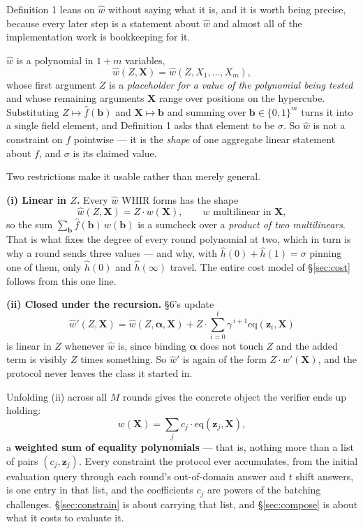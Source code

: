 \documentclass[11pt,a4paper]{article}
\newcommand{\eqp}{\mathrm{eq}}
\begin{document}
Definition 1 leans on $\hat w$ without saying what it is, and it is worth being
precise, because every later step is a statement about $\hat w$ and almost all of the
implementation work is bookkeeping for it.

$\hat w$ is a polynomial in $1+m$ variables,
\[
  \hat w(Z,\boldsymbol X)=\hat w(Z,X_{1},\dots,X_{m}),
\]
whose first argument $Z$ is a \emph{placeholder for a value of the polynomial being
tested} and whose remaining arguments $\boldsymbol X$ range over positions on the
hypercube. Substituting $Z\mapsto\hat f(\boldsymbol b)$ and $\boldsymbol
X\mapsto\boldsymbol b$ and summing over $\boldsymbol b\in\{0,1\}^{m}$ turns it into a
single field element, and Definition 1 asks that element to be $\sigma$. So $\hat w$ is
not a constraint on $f$ pointwise --- it is the \emph{shape} of one aggregate linear
statement about $f$, and $\sigma$ is its claimed value.

Two restrictions make it usable rather than merely general.

\smallskip
\noindent\textbf{(i) Linear in $Z$.} Every $\hat w$ WHIR forms has the shape
\[
  \hat w(Z,\boldsymbol X)=Z\cdot w(\boldsymbol X),
  \qquad w \text{ multilinear in } \boldsymbol X,
\]
so the sum $\sum_{\boldsymbol b}\hat f(\boldsymbol b)\,w(\boldsymbol b)$ is a sumcheck
over a \emph{product of two multilinears}. That is what fixes the degree of every round
polynomial at two, which in turn is why a round sends three values --- and why, with
$\hat h(0)+\hat h(1)=\sigma$ pinning one of them, only $\hat h(0)$ and $\hat h(\infty)$
travel. The entire cost model of \S\ref{sec:cost} follows from this one line.

\smallskip
\noindent\textbf{(ii) Closed under the recursion.} \S6's update
\[
  \hat w'(Z,\boldsymbol X)=\hat w(Z,\boldsymbol\alpha,\boldsymbol X)
  + Z\cdot\sum_{i=0}^{t}\gamma^{\,i+1}\eqp(\boldsymbol z_{i},\boldsymbol X)
\]
is linear in $Z$ whenever $\hat w$ is, since binding $\boldsymbol\alpha$ does not touch
$Z$ and the added term is visibly $Z$ times something. So $\hat w'$ is again of the form
$Z\cdot w'(\boldsymbol X)$, and the protocol never leaves the class it started in.

\smallskip
Unfolding (ii) across all $M$ rounds gives the concrete object the verifier ends up
holding:
\[
  w(\boldsymbol X)=\sum_{j} c_{j}\cdot\eqp(\boldsymbol z_{j},\boldsymbol X),
\]
a \textbf{weighted sum of equality polynomials} --- that is, nothing more than a list of
pairs $(c_{j},\boldsymbol z_{j})$. Every constraint the protocol ever accumulates, from
the initial evaluation query through each round's out-of-domain answer and $t$ shift
answers, is one entry in that list, and the coefficients $c_{j}$ are powers of the
batching challenges. \S\ref{sec:constrain} is about carrying that list, and \S\ref{sec:compose} is about what it
costs to evaluate it.
\end{document}
